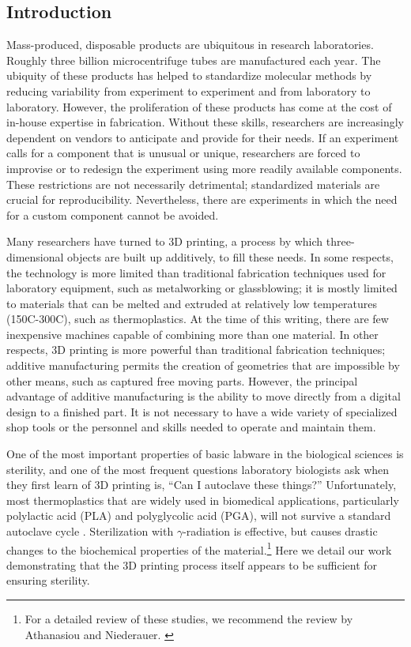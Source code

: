 \begin{refsection}
\section{Introduction}

Mass-produced, disposable products are ubiquitous in research
laboratories.  Roughly three billion microcentrifuge tubes are
manufactured each year. \cite{eppy} The ubiquity of these products has
helped to standardize molecular methods by reducing variability from
experiment to experiment and from laboratory to laboratory. However,
the proliferation of these products has come at the cost of in-house
expertise in fabrication. Without these skills, researchers are
increasingly dependent on vendors to anticipate and provide for their
needs. If an experiment calls for a component that is unusual or
unique, researchers are forced to improvise or to redesign the
experiment using more readily available components. These restrictions
are not necessarily detrimental; standardized materials are crucial
for reproducibility. Nevertheless, there are experiments in which the
need for a custom component cannot be avoided.

Many researchers have turned to 3D printing, a process by which three-
dimensional objects are built up additively, to fill these needs. In
some respects, the technology is more limited than traditional
fabrication techniques used for laboratory equipment, such as
metalworking or glassblowing; it is mostly limited to materials that
can be melted and extruded at relatively low temperatures (150C-300C),
such as thermoplastics.  At the time of this writing, there are few
inexpensive machines capable of combining more than one material. In
other respects, 3D printing is more powerful than traditional
fabrication techniques; additive manufacturing permits the creation of
geometries that are impossible by other means, such as captured free
moving parts. However, the principal advantage of additive
manufacturing is the ability to move directly from a digital design to
a finished part. It is not necessary to have a wide variety of
specialized shop tools or the personnel and skills needed to operate
and maintain them.

One of the most important properties of basic labware in the
biological sciences is sterility, and one of the most frequent
questions laboratory biologists ask when they first learn of 3D
printing is, ``Can I autoclave these things?'' Unfortunately, most
thermoplastics that are widely used in biomedical applications,
particularly polylactic acid (PLA) and polyglycolic acid (PGA), will
not survive a standard autoclave cycle
\cite{steam_sterilization_PLA}. Sterilization with $\gamma$-radiation
is effective, but causes drastic changes to the biochemical properties
of the material.\footnote{For a detailed review of these studies, we
  recommend the review by Athanasiou and
  Niederauer. \cite{pla_suture_review}} \cite{gama_radiation_PLA} Here
we detail our work demonstrating that the 3D printing process itself
appears to be sufficient for ensuring sterility.


\end{refsection}
